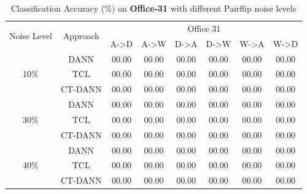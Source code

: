 \begin{center}
\begin{table}[h!]
    \centering
    \begin{tabular}{|c|c|c|c|c|c|c|c|}
    \hline
    \multirow{2}{3em}{Noise Level} & \multirow{2}{4em}{Approach} &  \multicolumn{6}{|c|}{Office 31}\\
    \cline{3-8}
    & & A->D & A->W & D->A & D->W & W->A & W->D\\
    \hline
    
    \multirow{3}{3em}{10\%} & DANN & 00.00 & 00.00 & 00.00 & 00.00 & 00.00 & 00.00 \\
    & TCL & 00.00 & 00.00 & 00.00 & 00.00 & 00.00 & 00.00 \\
    & CT-DANN & 00.00 & 00.00 & 00.00 & 00.00 & 00.00 & 00.00 \\
    \hline
    
    \multirow{3}{3em}{30\%} & DANN & 00.00 & 00.00 & 00.00 & 00.00 & 00.00 & 00.00 \\
    & TCL & 00.00 & 00.00 & 00.00 & 00.00 & 00.00 & 00.00 \\
    & CT-DANN & 00.00 & 00.00 & 00.00 & 00.00 & 00.00 & 00.00 \\
    \hline
    
    \multirow{3}{3em}{40\%} & DANN & 00.00 & 00.00 & 00.00 & 00.00 & 00.00 & 00.00 \\
    & TCL & 00.00 & 00.00 & 00.00 & 00.00 & 00.00 & 00.00 \\
    & CT-DANN & 00.00 & 00.00 & 00.00 & 00.00 & 00.00 & 00.00 \\
    \hline
    \end{tabular}
    \caption{Classification Accuracy (\%) on \textbf{Office-31} with different Pairflip noise levels}
    \label{tab:office_pair}
    \end{table}

\end{center}

